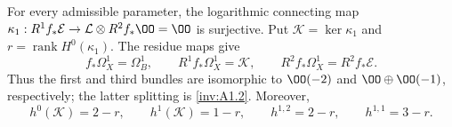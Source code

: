 \begin{lemma}
\hypertarget{tag-S6_NEW_RESIDUE_TAG}{}\label{pub:I:residue-kernel-rank}
For every admissible parameter, the logarithmic connecting map
$\kappa_1:R^1f_*\mathcal E\to\mathcal L\otimes R^2f_*\OO=\OO$
is surjective. Put
$\mathcal K=\ker\kappa_1$ and
$r=\operatorname{rank}H^0(\kappa_1)$. The residue maps give
\[
f_*\Omega_X^1=\Omega_B^1,\qquad
R^1f_*\Omega_X^1=\mathcal K,\qquad
R^2f_*\Omega_X^1=R^2f_*\mathcal E.
\]
Thus the first and third bundles are isomorphic to $\OO(-2)$ and
$\OO\oplus\OO(-1)$, respectively; the latter splitting is \cref{inv:A1.2}.
Moreover,
\[
h^0(\mathcal K)=2-r,\qquad h^1(\mathcal K)=1-r,\qquad
h^{1,2}=2-r,\qquad h^{1,1}=3-r.
\]
\end{lemma}
